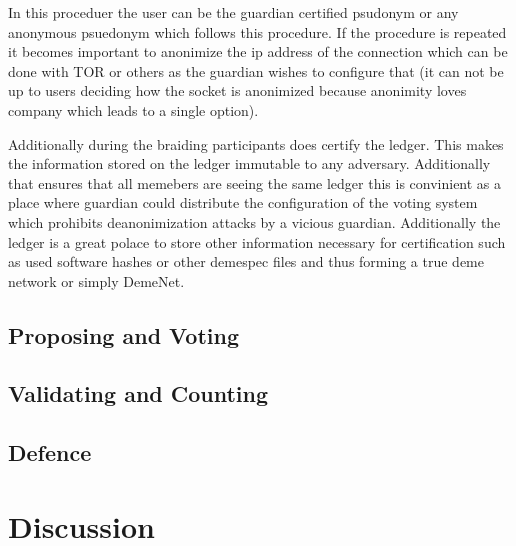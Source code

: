 \documentclass{article}
\begin{document}
In this proceduer the user can be the guardian certified psudonym or any anonymous psuedonym which follows this procedure. If the procedure is repeated it becomes important to anonimize the ip address of the connection which can be done with TOR or others as the guardian wishes to configure that (it can not be up to users deciding how the socket is anonimized because anonimity loves company which leads to a single option).

Additionally during the braiding participants does certify the ledger. This makes the information stored on the ledger immutable to any adversary. Additionally that ensures that all memebers are seeing the same ledger this is convinient as a place where guardian could distribute the configuration of the voting system which prohibits deanonimization attacks by a vicious guardian. Additionally the ledger is a great polace to store other information necessary for certification such as used software hashes or other demespec files and thus forming a true deme network or simply DemeNet.

\subsection{Proposing and Voting}


\subsection{Validating and Counting}


\subsection{Defence}


\section{Discussion}
\end{document}
